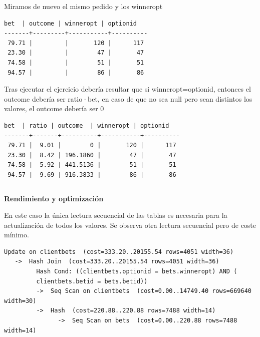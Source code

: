 \documentclass{article}
\begin{document}
Miramos de nuevo el mismo pedido y los winneropt
\begin{lstlisting}[style=sql]
  bet  | outcome | winneropt | optionid
-------+---------+-----------+----------
 79.71 |         |       120 |      117
 23.30 |         |        47 |       47
 74.58 |         |        51 |       51
 94.57 |         |        86 |       86
 \end{lstlisting}
Tras ejecutar el ejercicio debería resultar que si winneropt=optionid, entonces el outcome debería ser ratio·bet, en caso de que no sea null pero sean distintos los valores, el outcome debería ser 0
\begin{lstlisting}[style=sql]
  bet  | ratio | outcome  | winneropt | optionid
-------+-------+----------+-----------+----------
 79.71 |  9.01 |        0 |       120 |      117
 23.30 |  8.42 | 196.1860 |        47 |       47
 74.58 |  5.92 | 441.5136 |        51 |       51
 94.57 |  9.69 | 916.3833 |        86 |       86
 \end{lstlisting}

$$\;$$

\textbf{Rendimiento y optimización}

En este caso la única lectura secuencial de las tablas es necesaria para la actualización de todos los valores. Se observa otra lectura secuencial pero de coste mínimo.

\begin{lstlisting}[style=sql]
 Update on clientbets  (cost=333.20..20155.54 rows=4051 width=36)
   ->  Hash Join  (cost=333.20..20155.54 rows=4051 width=36)
         Hash Cond: ((clientbets.optionid = bets.winneropt) AND (
         clientbets.betid = bets.betid))
         ->  Seq Scan on clientbets  (cost=0.00..14749.40 rows=669640 width=30)
         ->  Hash  (cost=220.88..220.88 rows=7488 width=14)
               ->  Seq Scan on bets  (cost=0.00..220.88 rows=7488 width=14)
\end{lstlisting}
\end{document}
